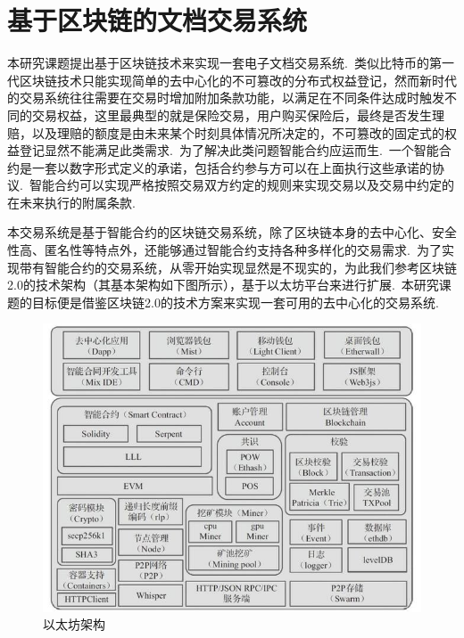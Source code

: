 \documentclass[a4paper,12pt,titlepage]{ctexart}
\begin{document}
\section{基于区块链的文档交易系统}
本研究课题提出基于区块链技术来实现一套电子文档交易系统.~类似比特币的第一代区块链技术只能实现简单的去中心化的不可篡改的分布式权益登记，然而新时代的交易系统往往需要在交易时增加附加条款功能，以满足在不同条件达成时触发不同的交易权益，这里最典型的就是保险交易，用户购买保险后，最终是否发生理赔，以及理赔的额度是由未来某个时刻具体情况所决定的，不可篡改的固定式的权益登记显然不能满足此类需求.~为了解决此类问题智能合约应运而生.~一个智能合约是一套以数字形式定义的承诺，包括合约参与方可以在上面执行这些承诺的协议.~智能合约可以实现严格按照交易双方约定的规则来实现交易以及交易中约定的在未来执行的附属条款.~\par
本交易系统是基于智能合约的区块链交易系统，除了区块链本身的去中心化、安全性高、匿名性等特点外，还能够通过智能合约支持各种多样化的交易需求.~为了实现带有智能合约的交易系统，从零开始实现显然是不现实的，为此我们参考区块链2.0的技术架构（其基本架构如下图所示），基于以太坊平台来进行扩展.~本研究课题的目标便是借鉴区块链2.0的技术方案来实现一套可用的去中心化的交易系统.~\par
\begin{figure}[!hbp]
	\centering
	\includegraphics[scale=0.6]{fig6.jpg}
	\caption{以太坊架构}
\end{figure}
\end{document}
